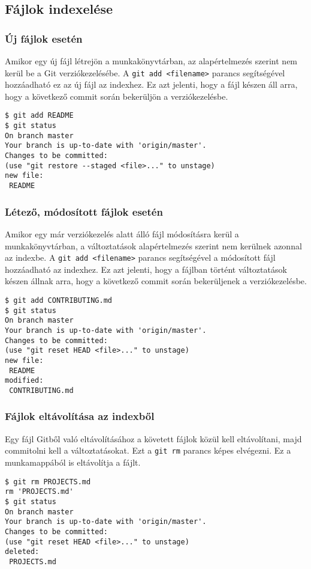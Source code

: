 \documentclass{article}
\begin{document}
\subsection*{Fájlok indexelése}
\subsubsection*{Új fájlok esetén}
Amikor egy új fájl létrejön a munkakönyvtárban, az alapértelmezés szerint nem kerül be a Git verziókezelésébe. A \texttt{git add <filename>} parancs segítségével hozzáadható ez az új fájl az indexhez. Ez azt jelenti, hogy a fájl készen áll arra, hogy a következő commit során bekerüljön a verziókezelésbe.
\begin{lstlisting}
$ git add README
$ git status
On branch master
Your branch is up-to-date with 'origin/master'.
Changes to be committed:
(use "git restore --staged <file>..." to unstage)
new file:
 README
\end{lstlisting}

\subsubsection*{Létező, módosított fájlok esetén}
Amikor egy már verziókezelés alatt álló fájl módosításra kerül a munkakönyvtárban, a változtatások alapértelmezés szerint nem kerülnek azonnal az indexbe. A \texttt{git add <filename>} parancs segítségével a módosított fájl hozzáadható az indexhez. Ez azt jelenti, hogy a fájlban történt változtatások készen állnak arra, hogy a következő commit során bekerüljenek a verziókezelésbe.
\begin{lstlisting}
$ git add CONTRIBUTING.md
$ git status
On branch master
Your branch is up-to-date with 'origin/master'.
Changes to be committed:
(use "git reset HEAD <file>..." to unstage)
new file:
 README
modified:
 CONTRIBUTING.md
\end{lstlisting}

\subsubsection*{Fájlok eltávolítása az indexből}
Egy fájl Gitből való eltávolításához a követett fájlok közül kell eltávolítani, majd commitolni kell a változtatásokat. Ezt a \texttt{git rm} parancs képes elvégezni. Ez a munkamappából is eltávolítja a fájlt.
\begin{lstlisting}
$ git rm PROJECTS.md
rm 'PROJECTS.md'
$ git status
On branch master
Your branch is up-to-date with 'origin/master'.
Changes to be committed:
(use "git reset HEAD <file>..." to unstage)
deleted:
 PROJECTS.md
\end{lstlisting}
\end{document}
